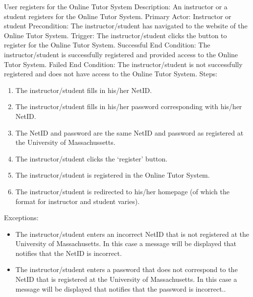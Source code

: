     \begin{section}{User registers for the Online Tutor System}
		Description: An instructor or a student registers for the Online Tutor System. \newline
		Primary Actor: Instructor or student \newline
		Precondition: The instructor/student has navigated to the website of the Online Tutor System. \newline
		Trigger: The instructor/student clicks the button to register for the Online Tutor System. \newline
		Successful End Condition: The instructor/student is successfully registered and provided access to the Online Tutor System. \newline
		Failed End Condition: The instructor/student is not successfully registered and does not have access to the Online Tutor System. \newline
		\newline
        Steps:
        \begin{enumerate}
            \item{The instructor/student fills in his/her NetID.}
            \item{The instructor/student fills in his/her password corresponding with his/her NetID.}
            \item{The NetID and password are the same NetID and password as registered at the University of Massachussetts.}
			\item{The instructor/student clicks the ‘register’ button.}
			\item{The instructor/student is registered in the Online Tutor System.}
			\item{The instructor/student is redirected to his/her homepage (of which the format for instructor and student varies).}
        \end{enumerate}
        Exceptions:
        \begin{itemize}
            \item{The instructor/student enters an incorrect NetID that is not registered at the University of Massachusetts. In this case a message will be displayed that notifies that the NetID is incorrect.}
			\item{The instructor/student enters a password that does not correspond to the NetID that is registered at the University of Massachusetts. In this case a message will be displayed that notifies that the password is incorrect..}
        \end{itemize}
    \end{section}		
	
